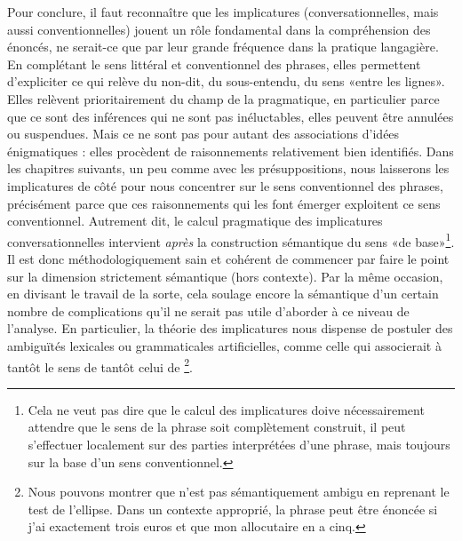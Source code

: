 \begin{refsegment}
\bigskip

\sloppy

Pour conclure, il faut reconnaître que les implicatures (conversationnelles, mais aussi conventionnelles) jouent un rôle fondamental dans la compréhension des énoncés, ne serait-ce que par leur grande fréquence dans la pratique langagière.  En complétant le sens littéral et conventionnel des phrases, elles permettent d'expliciter ce qui relève du non-dit, du sous-entendu, du  sens «entre les lignes».  Elles relèvent prioritairement du champ de la pragmatique, en particulier parce que ce sont des inférences qui ne sont pas inéluctables, elles peuvent être annulées ou suspendues.  Mais ce ne sont pas pour autant des associations d'idées énigmatiques : elles procèdent de raisonnements relativement bien identifiés.  Dans les chapitres suivants,  un peu comme avec les présuppositions,  nous laisserons les implicatures de côté pour nous concentrer sur le sens conventionnel des phrases, précisément parce que ces raisonnements qui les font émerger exploitent ce sens conventionnel.  Autrement dit, le calcul pragmatique des implicatures conversationnelles intervient \emph{après} la construction sémantique du sens «de base»\footnote{Cela ne veut pas dire que le calcul des implicatures doive nécessairement attendre que le sens de la phrase soit complètement construit, il peut s'effectuer localement sur des parties interprétées d'une phrase, mais toujours sur la base d'un sens conventionnel.}. Il est donc méthodologiquement sain et cohérent de commencer par faire le point sur la dimension strictement sémantique (hors contexte).  
Par la même occasion, en divisant le travail de la sorte, cela soulage encore la sémantique d'un certain nombre de complications qu'il ne serait pas utile d'aborder à ce niveau de l'analyse.
En particulier, la théorie des implicatures nous dispense de postuler des ambiguïtés lexicales ou grammaticales artificielles, comme celle qui associerait à  tantôt le sens de  tantôt celui de \footnote{Nous pouvons montrer que  n'est pas sémantiquement ambigu en reprenant le test de l'ellipse. Dans un contexte approprié, la phrase  peut être énoncée si j'ai exactement trois euros et que mon allocutaire en a cinq.}. 

\fussy



\bigskip




\end{refsegment}
